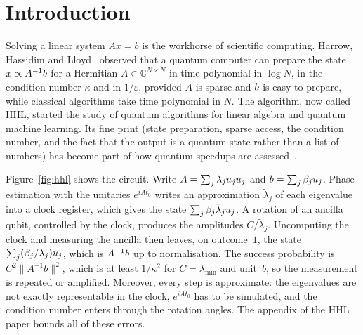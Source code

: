 \documentclass[runningheads]{llncs}
\newcommand{\C}{\mathbb{C}}
\let\ket\relax\let\bra\relax\let\braket\relax\let\ketbra\relax
\newcommand{\ket}[1]{|#1\rangle}
\newcommand{\bra}[1]{\langle #1|}
\newcommand{\braket}[2]{\langle #1|#2\rangle}
\newcommand{\ketbra}[2]{|#1\rangle\langle #2|}
\newcommand{\norm}[1]{\|#1\|}
\begin{document}
\section{Introduction}\label{sec:intro}

Solving a linear system $Ax=b$ is the workhorse of scientific computing. Harrow, Hassidim and
Lloyd~\cite{hhl2009} observed that a quantum computer can prepare the state $\ket x\propto A^{-1}\ket
b$ for a Hermitian $A\in\C^{N\times N}$ in time polynomial in $\log N$, in the condition number
$\kappa$ and in $1/\varepsilon$, provided $A$ is sparse and $\ket b$ is easy to prepare, while
classical algorithms take time polynomial in $N$. The algorithm, now called HHL, started the study of
quantum algorithms for linear algebra and quantum machine learning. Its fine print (state
preparation, sparse access, the condition number, and the fact that the output is a quantum state
rather than a list of numbers) has become part of how quantum speedups are assessed~\cite{aaronson2015}.

Figure~\ref{fig:hhl} shows the circuit. Write $A=\sum_j\lambda_j\ketbra{u_j}{u_j}$ and $\ket
b=\sum_j\beta_j\ket{u_j}$. Phase estimation with the unitaries $e^{iAt_0}$ writes an approximation
$\tilde\lambda_j$ of each eigenvalue into a clock register, which gives the state
$\sum_j\beta_j\ket{\tilde\lambda_j}\ket{u_j}$. A rotation of an ancilla qubit, controlled by the clock,
produces the amplitudes $C/\tilde\lambda_j$. Uncomputing the clock and measuring the ancilla then
leaves, on outcome~$1$, the state $\sum_j(\beta_j/\lambda_j)\ket{u_j}$, which is $A^{-1}\ket b$ up to
normalisation. The success probability is $C^2\norm{A^{-1}b}^2$, which is at least $1/\kappa^2$ for
$C=\lambda_{\min}$ and unit~$b$, so the measurement is repeated or amplified. Moreover, every step is
approximate: the eigenvalues are not exactly representable in the clock, $e^{iAt_0}$ has to be
simulated, and the condition number enters through the rotation angles. The appendix of the HHL paper
bounds all of these errors.
\end{document}
